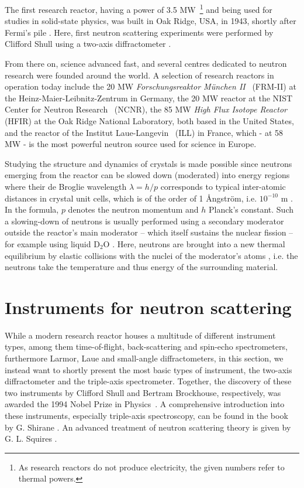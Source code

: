The first research reactor, having a power of 3.5 MW~\footnote{As research reactors do not produce electricity,
the given numbers refer to thermal powers.} and being used for studies in solid-state physics, was built in
Oak Ridge, USA, in 1943, shortly after Fermi's pile \cite[p. 3]{Jacrot2021}.
Here, first neutron scattering experiments were performed by Clifford Shull using a two-axis diffractometer \cite[pp. 3, 37]{Jacrot2021}.

From there on, science advanced fast, and several centres dedicated to neutron research were founded around the world.
A selection of research reactors in operation today include the 20 MW \textit{Forschungsreaktor M\"unchen II}~\cite{web_mlz}
(FRM-II) at the Heinz-Maier-Leibnitz-Zentrum in Germany,
the 20 MW reactor at the NIST Center for Neutron Research~\cite{web_nist} (NCNR),
the 85 MW \textit{High Flux Isotope Reactor}~\cite{web_oakridge} (HFIR) at the Oak Ridge National Laboratory,
both based in the United States,
and the reactor of the Institut Laue-Langevin~\cite{web_ill} (ILL) in France, which - at 58 MW - is the most
powerful neutron source used for science in Europe.

Studying the structure and dynamics of crystals is made possible since neutrons emerging from the reactor can be
slowed down (moderated) into energy regions where their de Broglie wavelength $\lambda = h/p$ \cite[p. 89]{Gross2012}
corresponds to typical inter-atomic distances in crystal unit cells, which is of the order of 1 \AA{}ngstr\"om,
i.e. $10^{-10}$ m \cite[pp.1,3]{Squires2012}. In the formula, $p$ denotes the neutron momentum and $h$ Planck's constant.
Such a slowing-down of neutrons is usually performed using a secondary moderator outside the reactor's main moderator --
which itself sustains the nuclear fission -- for example using liquid $\mathrm{D_2O}$ \cite[p. 82]{Jacrot2021}.
Here, neutrons are brought into a new thermal equilibrium by elastic collisions with the nuclei of the moderator's
atoms \cite[p. 30]{Stacey2007}, i.e. the neutrons take the temperature and thus energy of the surrounding material.



\section{Instruments for neutron scattering \label{sec:instruments}}

While a modern research reactor houses a multitude of different instrument types, among them time-of-flight,
back-scattering and spin-echo spectrometers, furthermore Larmor, Laue and small-angle diffractometers, in
this section, we instead want to shortly present the most basic types of instrument, the two-axis diffractometer
and the triple-axis spectrometer. Together, the discovery of these two instruments by Clifford Shull and Bertram Brockhouse,
respectively, was awarded the 1994 Nobel Prize in Physics~\cite{web_nobel1994}.
A comprehensive introduction into these instruments, especially triple-axis spectroscopy, can be found in the
book by G. Shirane \cite{Shirane2002}. An advanced treatment of neutron scattering theory is given by
G. L. Squires \cite{Squires2012}.


